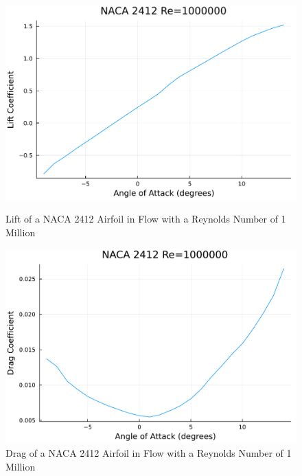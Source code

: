 \documentclass{article}
\begin{document}
\begin{figure}[h]
    \centering
\begin{minipage}[b]{0.32\textwidth}
\centering
\includegraphics[width=\textwidth]{NACA 2412 Re=1000000_Lift_Coefficent_Plot.pdf}
\caption{Lift of a NACA 2412 Airfoil in Flow with a Reynolds Number of 1 Million}
\label{fig:NACA 2412 Re=1000000 Lift}
\end{minipage}
\begin{minipage}[b]{0.32\textwidth}
\centering
\includegraphics[width=\textwidth]{NACA 2412 Re=1000000_Drag_Coefficent_Plot.pdf}
\caption{Drag of a NACA 2412 Airfoil in Flow with a Reynolds Number of 1 Million}
\label{fig:NACA 2412 Re=1000000 Drag}
\end{minipage}
\begin{minipage}[b]{0.32\textwidth}
\centering

\end{minipage}
\end{figure}
\end{document}
